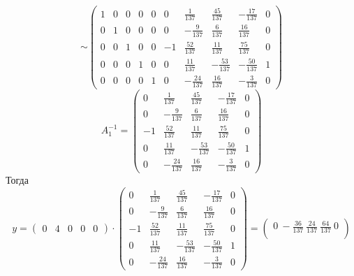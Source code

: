 \documentclass{article}
\begin{document}
\begin{equation*}
\sim
\left(\begin{array}{ccccc|cccccc}  
 1 & 0 & 0 & 0 & 0 & 0 & \frac{1}{137} & \frac{45}{137} & -\frac{17}{137} & 0\\ 
 0 & 1 & 0 & 0 & 0 & 0 & -\frac{9}{137} & \frac{6}{137} & \frac{16}{137} & 0 \\
 0 & 0 & 1 & 0 & 0 & -1 & \frac{52}{137} & \frac{11}{137} & \frac{75}{137} & 0\\
 0 & 0 & 0 & 1 & 0 & 0 & \frac{11}{137} & -\frac{53}{137} & -\frac{50}{137} & 1\\
 0 & 0 & 0 & 0 & 1 & 0 & -\frac{24}{137} & \frac{16}{137} & -\frac{3}{137} & 0
\end{array}\right)     
\end{equation*}
\begin{equation*}
    A_1^{-1}=
  \begin{pmatrix}
  0 & \frac{1}{137} & \frac{45}{137} & -\frac{17}{137} & 0\\ 
 0 & -\frac{9}{137} & \frac{6}{137} & \frac{16}{137} & 0 \\
 -1 & \frac{52}{137} & \frac{11}{137} & \frac{75}{137} & 0\\
 0 & \frac{11}{137} & -\frac{53}{137} & -\frac{50}{137} & 1\\
 0 & -\frac{24}{137} & \frac{16}{137} & -\frac{3}{137} & 0
  \end{pmatrix}   
 
\end{equation*}
Тогда 
\begin{equation*}
    y=
    \begin{pmatrix}
    0 & 4 & 0 & 0 & 0 
    \end{pmatrix}
    \cdot
   \begin{pmatrix}
  0 & \frac{1}{137} & \frac{45}{137} & -\frac{17}{137} & 0\\ 
 0 & -\frac{9}{137} & \frac{6}{137} & \frac{16}{137} & 0 \\
 -1 & \frac{52}{137} & \frac{11}{137} & \frac{75}{137} & 0\\
 0 & \frac{11}{137} & -\frac{53}{137} & -\frac{50}{137} & 1\\
 0 & -\frac{24}{137} & \frac{16}{137} & -\frac{3}{137} & 0
  \end{pmatrix}
  =
  \begin{pmatrix}
  0~-\frac{36}{137}~\frac{24}{137}~\frac{64}{137}~0\\
  \end{pmatrix}
\end{equation*}
\end{document}

